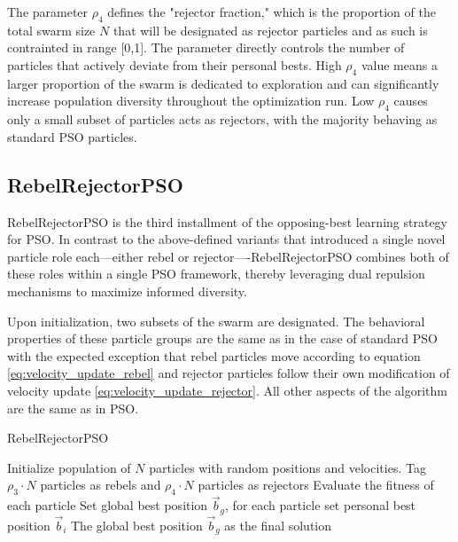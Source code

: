 {The parameter $\rho_4$ defines the "rejector fraction," which is the proportion of the total swarm size $N$ that will be designated as rejector particles and as such is contrainted in range [0,1]. The parameter directly controls the number of particles that actively deviate from their personal bests. High $\rho_4$ value means a larger proportion of the swarm is dedicated to exploration and can significantly increase population diversity throughout the optimization run. Low $\rho_4$ causes only a small subset of particles acts as rejectors, with the majority behaving as standard PSO particles.

\subsection{RebelRejectorPSO}

RebelRejectorPSO is the third installment of the opposing-best learning strategy for PSO. 
In contrast to the above-defined variants that introduced a single novel particle role each---either rebel or rejector----RebelRejectorPSO combines both of these roles within a single PSO framework, thereby leveraging dual repulsion mechanisms to maximize informed diversity. 

Upon initialization, two subsets of the swarm are designated.
The behavioral properties of these particle groups are the same as in the case of standard PSO with the expected exception that rebel particles move according to equation \eqref{eq:velocity_update_rebel} and rejector particles follow their own modification of velocity update \eqref{eq:velocity_update_rejector}. All other aspects of the algorithm are the same as in PSO.

\vspace{.935em}
\begin{algorithm}[H]
\caption{RebelRejectorPSO}\label{alg:rebel_rejector}
Initialize population of \(N\) particles with random positions and velocities. Tag \(\rho_3 \cdot N\) particles as rebels and  \(\rho_4 \cdot N\) particles as rejectors\;
Evaluate the fitness of each particle\;
Set global best position \(\vec{b}_g\), for each particle set personal best position \(\vec{b}_i\)\;
\Return The global best position \(\vec{b}_g\) as the final solution\;
\end{algorithm}
\vspace{.935em}


}
